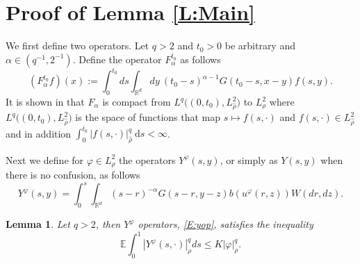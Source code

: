 \documentclass[a4paper,11pt]{article}
\numberwithin{equation}{section}
\theoremstyle{plain}
\newtheorem{lemma}[theorem]{Lemma}
\theoremstyle{definition}
\newcommand{\R}{\mathbb{R}}
\newcommand{\E}{\mathbb{E}}
\newcommand{\ud}{\ensuremath{\mathrm{d}}}
\begin{document}
\section{Proof of Lemma \ref{L:Main}}
We first define two operators. Let $q>2$ and $t_0>0$ be arbitrary and $\alpha \in (q^{-1},2^{-1})$. Define the operator $F_\alpha^{t_0}$ as follows
\begin{equation}
	\label{E:fop}
	\left(F_{\alpha}^{t_0} f\right)(x) := \int_0^{t_0} ds \int_{\R^d} dy \: (t_0-s)^{\alpha-1}G(t_0-s,x-y)f(s,y) .
\end{equation}
It is shown in \cite{TessitoreZabczyk98M} that $F_\alpha$ is compact from $L^q\big((0,t_0),L^2_{\hat\rho} \big)$ to
$L^2_\rho$ where $L^q\big((0,t_0),L^2_{\hat\rho} \big)$ is the space of functions that map $s \mapsto f(s,\cdot)$ and
$f(s,\cdot) \in L^2_{\hat\rho}$ and in addition $\int_0^{t_0} |f(s,\cdot)|_{\hat\rho}^q \: \ud s < \infty$. 

Next we define for $\varphi \in L^2_{\rho}$ the operators $Y^\varphi(s,y)$, or simply as $Y(s,y)$ when there is no
confusion, as follows 
\begin{equation}
	\label{E:yop}
	Y^\varphi(s,y) =\int_0^s \int_{\R^d} (s-r)^{-\alpha}G(s-r,y-z)b(u^\varphi(r,z))W(dr,dz).
\end{equation} 

\begin{lemma} 
	\label{L:yineq}
	Let $q>2$, then $Y^\varphi$ operators, \eqref{E:yop}, satisfies the inequality
	\begin{equation}
		\label{E:yineq}
		\E\int_0^1 |Y^\varphi(s,\cdot)|_{\rho}^q ds \le K|\varphi|_\rho^q .
	\end{equation} 
\end{lemma}
\end{document}
